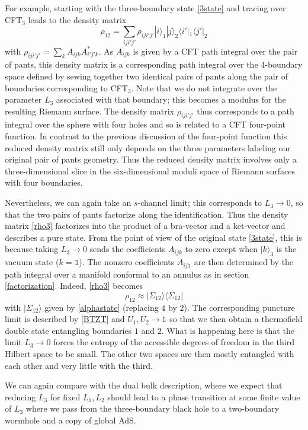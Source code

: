 \documentclass[12pt]{article}
\newcommand{\be}{\begin{equation}}
\newcommand{\ee}{\end{equation}}
\numberwithin{equation}{section}
\begin{document}
For example, starting with the three-boundary state \eqref{3state} and tracing over CFT${}_3$ leads to the density matrix
%
\be \label{rho3}
\rho_{12} = \sum_{iji'j'} \rho_{ij i'j'} |i \rangle_1 |j\rangle_2 \langle i' |_1 \langle j' |_2
\ee
%
with $\rho_{ij i'j'} = \sum_k A_{ijk} A^*_{i'j' k}$. As $A_{ijk}$ is given by a CFT path integral over the pair of pants, this density matrix is a corresponding path integral over the 4-boundary space defined by sewing together two identical pairs of pants along the pair of boundaries corresponding to CFT${}_3$. Note that we do not integrate over the parameter $L_3$ associated with that boundary; this becomes a modulus for the resulting Riemann surface. The density matrix $\rho_{ij i'j'}$ thus corresponds to a path integral over the sphere with four holes and so is related to a CFT four-point function. In contrast to the previous discussion of the four-point function this reduced density matrix still only depends on the three parameters labeling our original pair of pants geometry.  Thus the reduced density matrix involves only a three-dimensional slice in the six-dimensional moduli space of Riemann surfaces with four boundaries.

Nevertheless, we can again take an $s$-channel limit; this corresponds to $L_3 \to 0$, so that the two pairs of pants factorize along the identification.  Thus the density matrix \eqref{rho3} factorizes into the product of a bra-vector and a ket-vector and describes a pure state. From the point of view of the original state \eqref{3state}, this is because taking $L_3 \to 0$ sends the coefficients $A_{ijk}$ to zero except when $|k \rangle_3$ is the vacuum state ($k = \mathds{1}$). The nonzero coefficients $A_{ij\mathds{1}}$ are then determined by the path integral over a manifold conformal to an annulus as in section \ref{factorization}.  Indeed, \eqref{rho3} becomes
\be
\label{factorpure}
\rho_{12} \approx  |\Sigma_{12} \rangle\langle \Sigma_{12} |
\ee
with $|\Sigma_{12} \rangle$ given by \eqref{alphastate} (replacing $4$ by $2$). The corresponding puncture limit is described by \eqref{BTZT} and $U_1,U_2 \rightarrow \mathds{1}$ so that we then obtain a thermofield double state entangling boundaries $1$ and $2$.   What is happening here is that the limit $L_3 \to 0$ forces the entropy of the accessible degrees of freedom in the third Hilbert space to be small. The other two spaces are then mostly entangled with each other and very little with the third.

We can again compare with the dual bulk description, where we expect that reducing $L_3$ for fixed $L_1, L_2$ should lead to a phase transition at some finite value of $L_3$ where we pass from the three-boundary black hole to a two-boundary wormhole and a copy of global AdS.
\end{document}
